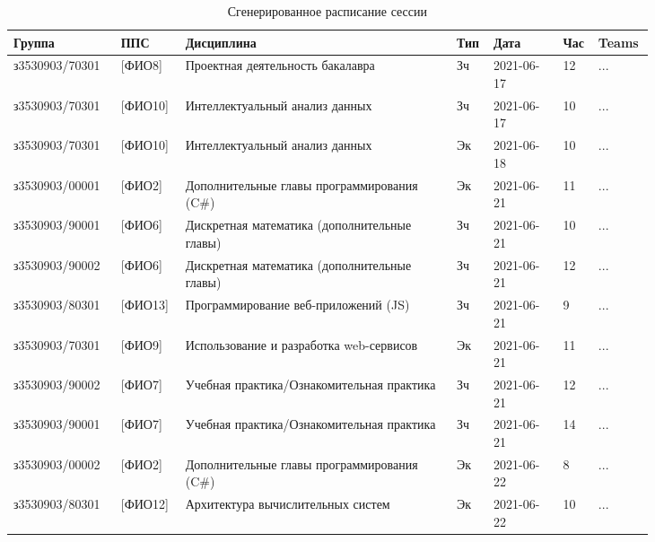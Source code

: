 \begin{table}[htbp]
	\centering\small 
	\caption{Сгенерированное расписание сессии}%
	\begin{tabular}{|p{0.15\linewidth}|p{0.08\linewidth}|p{0.39\linewidth}|p{0.03\linewidth}|p{0.1\linewidth}|p{0.03\linewidth}|p{0.05\linewidth}|}
		\hline
		Группа         & ППС     & Дисциплина                                                    & Тип & Дата       & Час & Teams \\ \hline
		з3530903/70301 & {[}ФИО8{]}        & Проектная деятельность бакалавра                              & Зч  & 2021-06-17 & 12    & ...    \\ \hline
		з3530903/70301 & {[}ФИО10{]}       & Интеллектуальный анализ данных                                & Зч  & 2021-06-17 & 10    & ...    \\ \hline
		з3530903/70301 & {[}ФИО10{]}       & Интеллектуальный анализ данных                                & Эк  & 2021-06-18 & 10    & ...    \\ \hline
		з3530903/00001 & {[}ФИО2{]}        & Дополнительные главы программирования (C\#)                   & Эк  & 2021-06-21 & 11    & ...    \\ \hline
		з3530903/90001 & {[}ФИО6{]}        & Дискретная математика (дополнительные главы)                  & Зч  & 2021-06-21 & 10    & ...    \\ \hline
		з3530903/90002 & {[}ФИО6{]}        & Дискретная математика (дополнительные главы)                  & Зч  & 2021-06-21 & 12    & ...    \\ \hline
		з3530903/80301 & {[}ФИО13{]}       & Программирование веб-приложений (JS)                          & Зч  & 2021-06-21 & 9     & ...    \\ \hline
		з3530903/70301 & {[}ФИО9{]}        & Использование и разработка web-сервисов                       & Эк  & 2021-06-21 & 11    & ...    \\ \hline
		з3530903/90002 & {[}ФИО7{]}        & Учебная практика/Ознакомительная практика                     & Зч  & 2021-06-21 & 12    & ...    \\ \hline
		з3530903/90001 & {[}ФИО7{]}        & Учебная практика/Ознакомительная практика                     & Зч  & 2021-06-21 & 14    & ...    \\ \hline
		з3530903/00002 & {[}ФИО2{]}        & Дополнительные главы программирования (C\#)                   & Эк  & 2021-06-22 & 8     & ...    \\ \hline
		з3530903/80301 & {[}ФИО12{]}       & Архитектура вычислительных систем                             & Эк  & 2021-06-22 & 10    & ...    \\ \hline

\end{tabular}
\end{table}
